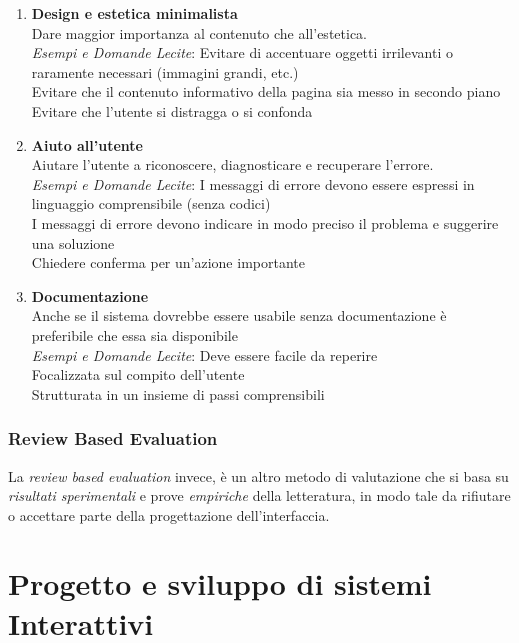 \documentclass[oneside]{book}
\begin{document}
\begin{enumerate}
			\item \textbf{Design e estetica minimalista} \\
			Dare maggior importanza al contenuto che all’estetica. \\
			\emph{Esempi e Domande Lecite}: 
			Evitare di accentuare oggetti irrilevanti o raramente necessari (immagini grandi, etc.) \\
			Evitare che il contenuto informativo della pagina sia messo in secondo piano \\
			Evitare che l’utente si distragga o si confonda \\

			\item \textbf{Aiuto all’utente} \\
			Aiutare l’utente a riconoscere, diagnosticare e recuperare l’errore. \\
			\emph{Esempi e Domande Lecite}: 
			I messaggi di errore devono essere espressi in linguaggio comprensibile (senza codici) \\
			I messaggi di errore devono indicare in modo preciso il problema e suggerire una soluzione \\
			Chiedere conferma per un’azione importante \\

			\item \textbf{Documentazione} \\
			Anche se il sistema dovrebbe essere usabile senza documentazione è preferibile che essa sia disponibile \\
			\emph{Esempi e Domande Lecite}: 
			Deve essere facile da reperire \\
			Focalizzata sul compito dell’utente \\
			Strutturata in un insieme di passi comprensibili \\
			\end{enumerate}

		\subsection{Review Based Evaluation} \label{reviewbasedevaluation}
			La \emph{review based evaluation} invece, è un altro metodo di valutazione che si basa su \emph{risultati sperimentali} e prove \emph{empiriche} della letteratura, in modo tale da rifiutare o accettare parte della progettazione dell'interfaccia.



\chapter{Progetto e sviluppo di sistemi Interattivi}
\end{document}
